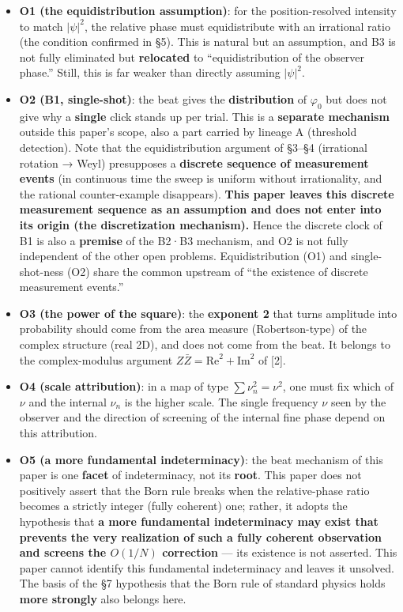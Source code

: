 \documentclass[
]{ltjsarticle}
\providecommand{\tightlist}{%
  \setlength{\itemsep}{0pt}\setlength{\parskip}{0pt}}
\begin{document}
\begin{itemize}
\tightlist
\item
  \textbf{O1 (the equidistribution assumption)}: for the
  position-resolved intensity to match \(|\psi|^2\), the relative phase
  must equidistribute with an irrational ratio (the condition confirmed
  in §5). This is natural but an assumption, and B3 is not fully
  eliminated but \textbf{relocated} to ``equidistribution of the
  observer phase.'' Still, this is far weaker than directly assuming
  \(|\psi|^2\).
\item
  \textbf{O2 (B1, single-shot)}: the beat gives the
  \textbf{distribution} of \(\varphi_0\) but does not give why a
  \textbf{single} click stands up per trial. This is a \textbf{separate
  mechanism} outside this paper's scope, also a part carried by lineage
  A (threshold detection). Note that the equidistribution argument of
  §3--§4 (irrational rotation → Weyl) presupposes a \textbf{discrete
  sequence of measurement events} (in continuous time the sweep is
  uniform without irrationality, and the rational counter-example
  disappears). \textbf{This paper leaves this discrete measurement
  sequence as an assumption and does not enter into its origin (the
  discretization mechanism).} Hence the discrete clock of B1 is also a
  \textbf{premise} of the B2·B3 mechanism, and O2 is not fully
  independent of the other open problems. Equidistribution (O1) and
  single-shot-ness (O2) share the common upstream of ``the existence of
  discrete measurement events.''
\item
  \textbf{O3 (the power of the square)}: the \textbf{exponent 2} that
  turns amplitude into probability should come from the area measure
  (Robertson-type) of the complex structure (real 2D), and does not come
  from the beat. It belongs to the complex-modulus argument
  \(Z\bar Z=\mathrm{Re}^2+\mathrm{Im}^2\) of {[}2{]}.
\item
  \textbf{O4 (scale attribution)}: in a map of type
  \(\sum\nu_n^2=\nu^2\), one must fix which of \(\nu\) and the internal
  \(\nu_n\) is the higher scale. The single frequency \(\nu\) seen by
  the observer and the direction of screening of the internal fine phase
  depend on this attribution.
\item
  \textbf{O5 (a more fundamental indeterminacy)}: the beat mechanism of
  this paper is one \textbf{facet} of indeterminacy, not its
  \textbf{root}. This paper does not positively assert that the Born
  rule breaks when the relative-phase ratio becomes a strictly integer
  (fully coherent) one; rather, it adopts the hypothesis that \textbf{a
  more fundamental indeterminacy may exist that prevents the very
  realization of such a fully coherent observation and screens the
  \(O(1/N)\) correction} --- its existence is not asserted. This paper
  cannot identify this fundamental indeterminacy and leaves it unsolved.
  The basis of the §7 hypothesis that the Born rule of standard physics
  holds \textbf{more strongly} also belongs here.
\end{itemize}
\end{document}

